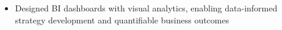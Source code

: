\begin{itemize}
    \item \small{Designed BI dashboards with visual analytics, enabling data-informed strategy development and quantifiable business outcomes}

\end{itemize}